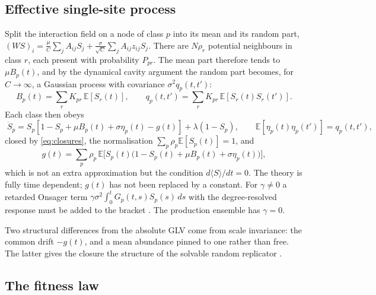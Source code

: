 \documentclass[11pt]{article}
\newcommand{\E}{\mathbb E}
\begin{document}
\subsection{Effective single-site process}
\label{sec:cavity}

Split the interaction field on a node of class $p$ into its mean and its random part,
$(WS)_i=\frac{\mu}{C}\sum_jA_{ij}S_j+\frac{\sigma}{\sqrt C}\sum_jA_{ij}z_{ij}S_j$.  There are
$N\rho_r$ potential neighbours in class $r$, each present with probability $P_{pr}$.  The mean
part therefore tends to $\mu B_p(t)$, and by the dynamical cavity argument
\citep{bunin2017,galla2018,aguirrelopez} the random part becomes, for $C\to\infty$, a Gaussian
process with covariance $\sigma^2q_p(t,t')$:
\begin{equation}
  B_p(t)=\sum_rK_{pr}\,\E[S_r(t)],\qquad
  q_p(t,t')=\sum_rK_{pr}\,\E[S_r(t)S_r(t')] .
  \label{eq:closures}
\end{equation}
Each class then obeys
\begin{equation}
  \boxed{\;\dot S_p=S_p\left[1-S_p+\mu B_p(t)+\sigma\eta_p(t)-g(t)\right]+\lambda(1-S_p),\qquad
  \E[\eta_p(t)\eta_p(t')]=q_p(t,t'),\;}
  \label{eq:hdmft}
\end{equation}
closed by \eqref{eq:closures}, the normalisation $\sum_p\rho_p\E[S_p(t)]=1$, and
\begin{equation}
  g(t)=\sum_p\rho_p\,\E\bigl[S_p(t)\bigl(1-S_p(t)+\mu B_p(t)+\sigma\eta_p(t)\bigr)\bigr],
  \label{eq:gclosure}
\end{equation}
which is not an extra approximation but the condition $d\langle S\rangle/dt=0$.  The theory is
fully time dependent; $g(t)$ has not been replaced by a constant.  For $\gamma\ne0$ a retarded
Onsager term $\gamma\sigma^2\int_0^tG_p(t,s)S_p(s)\,ds$ with the degree-resolved response must
be added to the bracket \citep{aguirrelopez}.  The production ensemble has $\gamma=0$.

Two structural differences from the absolute GLV come from scale invariance: the common drift
$-g(t)$, and a mean abundance pinned to one rather than free.  The latter gives the closure the
structure of the solvable random replicator \citep{diederich1989}.

\subsection{The fitness law}
\label{sec:fitnesslaw}
\end{document}
